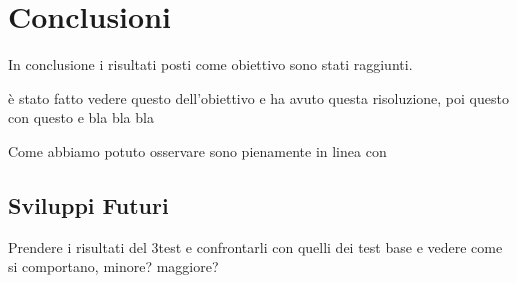 \section{Conclusioni}
\label{section:conclusioni}

In conclusione i risultati posti come obiettivo sono stati raggiunti.

è stato fatto vedere questo dell'obiettivo e ha avuto questa risoluzione, poi questo con questo e bla bla bla


Come abbiamo potuto osservare sono pienamente in linea con 


\subsection{Sviluppi Futuri}


Prendere i risultati del 3\degree test e confrontarli con quelli dei test base e vedere come si comportano, minore? maggiore?